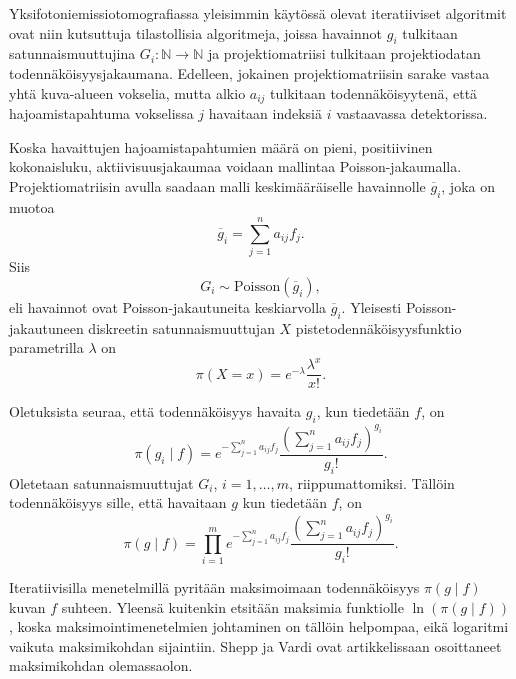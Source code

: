 Yksifotoniemissiotomografiassa yleisimmin käytössä olevat iteratiiviset algoritmit ovat niin kutsuttuja tilastollisia algoritmeja, joissa havainnot $g_i$ tulkitaan satunnaismuuttujina $G_i\colon\mathbb{N}\to\mathbb{N}$\cite{wettenhovi_omegaopen-source_2021, kaipio_statistical_2005} ja projektiomatriisi tulkitaan projektiodatan todennäköisyysjakaumana\cite{boudjelal_novel_2021}. Edelleen, jokainen projektiomatriisin sarake vastaa yhtä kuva-alueen vokselia, mutta alkio $a_{ij}$ tulkitaan todennäköisyytenä, että hajoamistapahtuma vokselissa $j$ havaitaan indeksiä $i$ vastaavassa detektorissa\cite{boudjelal_novel_2021}.

Koska havaittujen hajoamistapahtumien määrä on pieni, positiivinen kokonaisluku, aktiivisuusjakaumaa voidaan mallintaa Poisson-jakaumalla\cite{kaipio_statistical_2005}. Projektiomatriisin avulla saadaan malli keskimääräiselle havainnolle $\overline{g}_i$, joka on muotoa\cite{boudjelal_novel_2021, shepp_maximum_1982}
\begin{equation*}
    \overline{g}_i=\sum_{j=1}^{n}a_{ij}f_j.
\end{equation*}
Siis
\begin{equation*}
    G_i\sim\text{Poisson}(\overline{g}_i),
\end{equation*}
eli havainnot ovat Poisson-jakautuneita keskiarvolla $\overline{g}_i$\cite{kaipio_statistical_2005, bruyant_analytic_2002, wettenhovi_transmission_2021}. Yleisesti Poisson-jakautuneen diskreetin satunnaismuuttujan $X$ pistetodennäköisyysfunktio parametrilla $\lambda$ on
\begin{equation*}
    \pi(X=x)=e^{-\lambda}\frac{\lambda^{x}}{x!}.
\end{equation*}

Oletuksista seuraa, että todennäköisyys havaita $g_i$, kun tiedetään $f$, on
\begin{equation*}
    \pi(g_i \mid f)=e^{-\sum_{j=1}^{n}a_{ij}f_j}\frac{\left( \sum_{j=1}^{n}a_{ij}f_j \right)^{g_i}}{g_i!}.
\end{equation*}
Oletetaan satunnaismuuttujat $G_i$, $i=1,\ldots, m$, riippumattomiksi. Tällöin todennäköisyys sille, että havaitaan $g$ kun tiedetään $f$, on
\begin{equation*}
    \pi(g\mid f)=\prod_{i=1}^{m}e^{-\sum_{j=1}^{n}a_{ij}f_j}\frac{\left( \sum_{j=1}^{n}a_{ij}f_j \right)^{g_i}}{g_i!}.
\end{equation*}

Iteratiivisilla menetelmillä pyritään maksimoimaan todennäköisyys $\pi(g\mid f)$ kuvan $f$ suhteen. Yleensä kuitenkin etsitään maksimia funktiolle $\ln(\pi(g\mid f))$, koska maksimointimenetelmien johtaminen on tällöin helpompaa, eikä logaritmi vaikuta maksimikohdan sijaintiin. Shepp ja Vardi ovat artikkelissaan\cite{shepp_maximum_1982} osoittaneet maksimikohdan olemassaolon.

